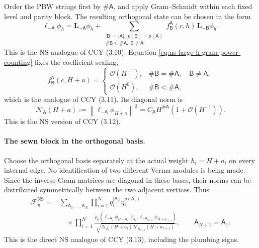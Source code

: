 \documentclass[11pt]{article}
\newcommand{\NS}{\mathrm{NS}}
\newcommand{\F}{\mathcal F}
\newcommand{\order}{\mathcal O}
\begin{document}
Order the PBW strings first by \(\#\mathsf A\), and apply Gram--Schmidt
within each fixed level and parity block.  The resulting orthogonal state
can be chosen in the form
\begin{equation}
 \boldsymbol\ell_{-\mathsf A}\phi_h
 =
 \mathbf L_{-\mathsf A}\phi_h
 +
 \sum_{\substack{
 |\mathsf B|=|\mathsf A|,\;
 p(\mathsf B)=p(\mathsf A)\\
 \#\mathsf B\leq\#\mathsf A,\;
 \mathsf B\neq\mathsf A}}
 f^{\mathsf A}_{\mathsf B}(c,h)\,
 \mathbf L_{-\mathsf B}\phi_h .
 \label{eq:ns-large-h-gram-schmidt}
\end{equation}
This is the NS analogue of CCY (3.10).  Equation
\eqref{eq:ns-large-h-gram-power-counting} fixes the coefficient scaling,
\begin{equation}
 f^{\mathsf A}_{\mathsf B}(c,H+a)
 =
 \begin{cases}
 \order(H^{-1}),
 &\#\mathsf B=\#\mathsf A,\quad
   \mathsf B\neq\mathsf A,\\[2pt]
 \order(H^0),
 &\#\mathsf B<\#\mathsf A ,
 \end{cases}
 \label{eq:ns-large-h-gram-schmidt-coefficients}
\end{equation}
which is the analogue of CCY (3.11).  Its diagonal norm is
\begin{equation}
 \mathcal N_{\mathsf A}(H+a)
 :=
 \left\|
 \boldsymbol\ell_{-\mathsf A}\phi_{H+a}
 \right\|^2
 =
 C_{\mathsf A}H^{\#\mathsf A}
 \left(1+\order(H^{-1})\right).
 \label{eq:ns-large-h-pbw-norm}
\end{equation}
This is the NS version of CCY (3.12).

\paragraph{The sewn block in the orthogonal basis.}
Choose the orthogonal basis separately at the actual weight
\(h_i=H+a_i\) on every internal edge.  No identification of two different
Verma modules is being made.  Since the inverse Gram matrices are diagonal
in these bases, their norms can be distributed symmetrically between the
two adjacent vertices.  Thus
\begin{equation}
 \begin{split}
 \F^{\NS}_{\boldsymbol\eta}
 ={}&
 \sum_{\mathsf A_1,\ldots,\mathsf A_N}
 \prod_{i=1}^{N}
 q_i^{|\mathsf A_i|}
 \eta_i^{p(\mathsf A_i)}
 \\
 &\quad\times
 \prod_{i=1}^{N}
 \frac{
 \rho_0\!\left(
 \boldsymbol\ell_{-\mathsf A_i}\phi_{H+a_i},
 \phi_{d_i},
 \boldsymbol\ell_{-\mathsf A_{i+1}}\phi_{H+a_{i+1}}
 \right)}
 {\sqrt{
 \mathcal N_{\mathsf A_i}(H+a_i)
 \mathcal N_{\mathsf A_{i+1}}(H+a_{i+1})}} ,
 \qquad
 \mathsf A_{N+1}=\mathsf A_1 .
 \end{split}
 \label{eq:ns-large-h-block-orthogonal-basis}
\end{equation}
This is the direct NS analogue of CCY (3.13), including the plumbing signs.
\end{document}
